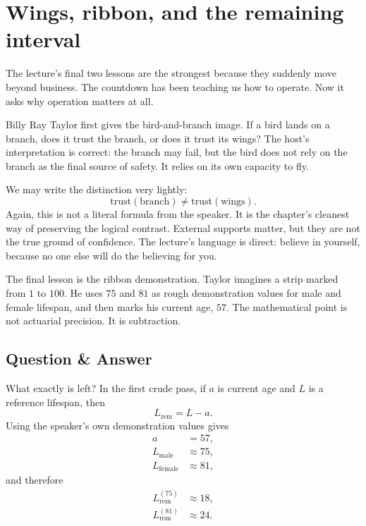 \section{Wings, ribbon, and the remaining interval}

The lecture's final two lessons are the strongest because they suddenly move beyond business. The countdown has been teaching us how to operate. Now it asks why operation matters at all.

Billy Ray Taylor first gives the bird-and-branch image. If a bird lands on a branch, does it trust the branch, or does it trust its wings? The host's interpretation is correct: the branch may fail, but the bird does not rely on the branch as the final source of safety. It relies on its own capacity to fly.

We may write the distinction very lightly:
\begin{equation}
\mathrm{trust}(\mathrm{branch}) \neq \mathrm{trust}(\mathrm{wings}).
\end{equation}
Again, this is not a literal formula from the speaker. It is the chapter's cleanest way of preserving the logical contrast. External supports matter, but they are not the true ground of confidence. The lecture's language is direct: believe in yourself, because no one else will do the believing for you.

The final lesson is the ribbon demonstration. Taylor imagines a strip marked from \(1\) to \(100\). He uses \(75\) and \(81\) as rough demonstration values for male and female lifespan, and then marks his current age, \(57\). The mathematical point is not actuarial precision. It is subtraction.

\subsection{Question \& Answer}

What exactly is left? In the first crude pass, if \(a\) is current age and \(L\) is a reference lifespan, then
\begin{equation}
L_{\mathrm{rem}} = L - a.
\end{equation}
Using the speaker's own demonstration values gives
\begin{align}
a &= 57, \\
L_{\mathrm{male}} &\approx 75, \\
L_{\mathrm{female}} &\approx 81,
\end{align}
and therefore
\begin{align}
L_{\mathrm{rem}}^{(75)} &\approx 18, \\
L_{\mathrm{rem}}^{(81)} &\approx 24.
\end{align}

